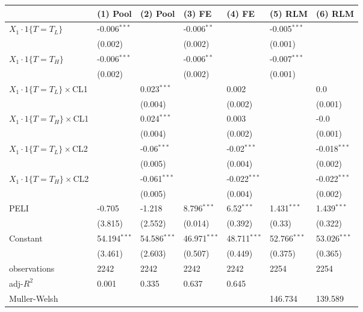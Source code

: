 \begin{tabular}{lllllll}
\hline
 & (1) Pool & (2) Pool & (3) FE & (4) FE & (5) RLM & (6) RLM \\
\hline
$X_1\cdot1\{T=T_L\}$ & -0.006$^{***}$ &  & -0.006$^{**}$ &  & -0.005$^{***}$ &  \\
 & (0.002) &  & (0.002) &  & (0.001) &  \\
$X_1\cdot1\{T=T_H\}$ & -0.006$^{***}$ &  & -0.006$^{**}$ &  & -0.007$^{***}$ &  \\
 & (0.002) &  & (0.002) &  & (0.001) &  \\
$X_1\cdot1\{T=T_L\}\times$CL1 &  & 0.023$^{***}$ &  & 0.002 &  & 0.0 \\
 &  & (0.004) &  & (0.002) &  & (0.001) \\
$X_1\cdot1\{T=T_H\}\times$CL1 &  & 0.024$^{***}$ &  & 0.003 &  & -0.0 \\
 &  & (0.004) &  & (0.002) &  & (0.001) \\
$X_1\cdot1\{T=T_L\}\times$CL2 &  & -0.06$^{***}$ &  & -0.02$^{***}$ &  & -0.018$^{***}$ \\
 &  & (0.005) &  & (0.004) &  & (0.002) \\
$X_1\cdot1\{T=T_H\}\times$CL2 &  & -0.061$^{***}$ &  & -0.022$^{***}$ &  & -0.022$^{***}$ \\
 &  & (0.005) &  & (0.004) &  & (0.002) \\
PELI & -0.705 & -1.218 & 8.796$^{***}$ & 6.52$^{***}$ & 1.431$^{***}$ & 1.439$^{***}$ \\
 & (3.815) & (2.552) & (0.014) & (0.392) & (0.33) & (0.322) \\
Constant & 54.194$^{***}$ & 54.586$^{***}$ & 46.971$^{***}$ & 48.711$^{***}$ & 52.766$^{***}$ & 53.026$^{***}$ \\
 & (3.461) & (2.603) & (0.507) & (0.449) & (0.375) & (0.365) \\\hline

observations & 2242 & 2242 & 2242 & 2242 & 2254 & 2254 \\
adj-$R^2$ & 0.001 & 0.335 & 0.637 & 0.645 &  &  \\
Muller-Welsh &  &  &  &  & 146.734 & 139.589 \\
\hline
\end{tabular}
